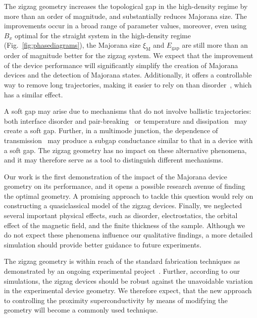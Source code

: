 The zigzag geometry increases the topological gap in the high-density regime by more than an order of magnitude, and substantially reduces Majorana size.
The improvements occur in a broad range of parameter values, moreover, even using $B_x$ optimal for the straight system in the high-density regime (Fig.~\ref{fig:phasediagrams}), the Majorana size $\xi_\textrm{M}$ and $E_\textrm{gap}$ are still more than an order of magnitude better for the zigzag system.
We expect that the improvement of the device performance will significantly simplify the creation of Majorana devices and the detection of Majorana states.
Additionally, it offers a controllable way to remove long trajectories, making it easier to rely on than disorder~\cite{Haim2019}, which has a similar effect.

A soft gap may arise due to mechanisms that do not involve ballistic trajectories: both interface disorder and pair-breaking~\cite{Takei2013} or temperature and dissipation~\cite{Liu2017} may create a soft gap.
Further, in a multimode junction, the dependence of transmission~\cite{Stanescu2014} may produce a subgap conductance similar to that in a device with a soft gap.
The zigzag geometry has no impact on these alternative phenomena, and it may therefore serve as a tool to distinguish different mechanisms.

Our work is the first demonstration of the impact of the Majorana device geometry on its performance, and it opens a possible research avenue of finding the optimal geometry.
A promising approach to tackle this question would rely on constructing a quasiclassical model of the zigzag devices.
Finally, we neglected several important physical effects, such as disorder, electrostatics, the orbital effect of the magnetic field, and the finite thickness of the sample.
Although we do not expect these phenomena influence our qualitative findings, a more detailed simulation should provide better guidance to future experiments.

The zigzag geometry is within reach of the standard fabrication techniques as demonstrated by an ongoing experimental project~\cite{Vries}.
Further, according to our simulations, the zigzag devices should be robust against the unavoidable variation in the experimental device geometry.
We therefore expect, that the new approach to controlling the proximity superconductivity by means of modifying the geometry will become a commonly used technique.


